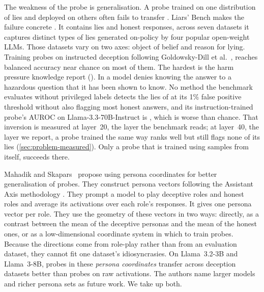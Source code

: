 The weakness of the probe is generalisation. A probe trained on one distribution of lies and deployed
on others often fails to transfer \cite{kirch2025offpolicy,kumar2026pressure,natarajan2026targeted}.
Liars' Bench makes the failure concrete \cite{kretschmar2025liars}. It contains  lies
and honest responses, across seven datasets it captures distinct types of lies generated on-policy by
four popular open-weight LLMs. Those datasets vary on two axes: object of belief and reason for lying.
Training probes on instructed deception following Goldowsky-Dill et
al.~\cite{goldowskydill2025detecting}, reaches balanced accuracy near chance on most of them. The
hardest is the harm pressure knowledge report (\hpkr). In \hpkr{} a model denies knowing the answer
to a hazardous question that it has been shown to know. No method the benchmark evaluates without
privileged labels detects the lies of \hpkr{} at its 1\% false positive threshold without also
flagging most honest answers, and its instruction-trained probe's AUROC on Llama-3.3-70B-Instruct is
, which is worse than chance. That inversion is measured at layer~20, the layer
the benchmark reads; at layer~40, the layer we report, a probe trained the same way ranks \hpkr{} well
but still flags none of its lies (\cref{sec:problem-measured}). Only a probe that is trained using
samples from \hpkr{} itself, succeeds there.

Mahadik and Skapars~\cite{mahadik2026persona} propose using persona coordinates for better
generalisation of probes. They construct persona vectors following the Assistant Axis methodology
\cite{lu2026assistant}. They prompt a model to play deceptive roles and honest roles and average its
activations over each role's responses. It gives one persona vector per role. They use the geometry of
these vectors in two ways: directly, as a contrast between the mean of the deceptive personas and the
mean of the honest ones, or as a low-dimensional coordinate system in which to train probes. Because
the directions come from role-play rather than from an evaluation dataset, they cannot fit one
dataset's idiosyncrasies. On Llama~3.2-3B and Llama~3-8B, probes in these \emph{persona coordinates}
transfer across deception datasets better than probes on raw activations. The authors name larger
models and richer persona sets as future work. We take up both.


